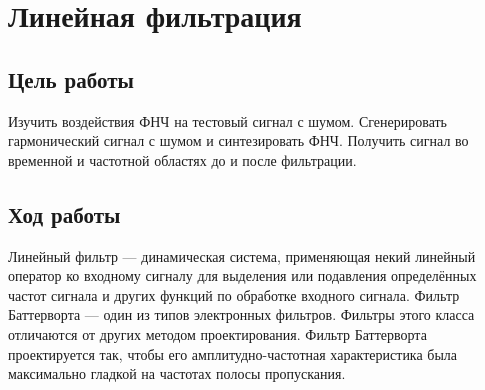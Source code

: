 \documentclass[10pt,a4paper]{article}
\begin{document}
\section{Линейная фильтрация}
\subsection{Цель работы}
Изучить воздействия ФНЧ на тестовый сигнал с шумом. Сгенерировать гармонический сигнал с шумом и синтезировать ФНЧ. Получить сигнал во временной и частотной областях до и после фильтрации.
\subsection{Ход работы}
Линейный фильтр — динамическая система, применяющая некий линейный оператор ко входному сигналу для выделения или подавления определённых частот сигнала и других функций по обработке входного сигнала. 
Фильтр Баттерворта — один из типов электронных фильтров. Фильтры этого класса отличаются от других методом проектирования. Фильтр Баттерворта проектируется так, чтобы его амплитудно-частотная характеристика была максимально гладкой на частотах полосы пропускания. 
\end{document}
